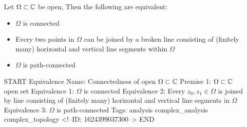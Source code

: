 \documentclass{memoir}
\begin{document}
\begin{thm}
	Let \(\Omega\subset \mathbb{C}\) be open, Then the following are equivalent:
	\begin{itemize}
		\item \(\Omega\) is connected
		\item Every two points in \(\Omega\) can be joined by a broken line consisting of (finitely many) horizontal and vertical line segments within \(\Omega\)
		\item \(\Omega\) is path-connected
	\end{itemize}
\end{thm}

\begin{anki}
START
Equivalence
Name: Connectedness of open \(\Omega\subset \mathbb{C}\)
Premise 1:  \(\Omega\subset \mathbb{C}\) open set
Equivalence 1: \(\Omega\) is connected
Equivalence 2: Every \(z_0,z_1 \in \Omega\) is joined by line consisting of (finitely many) horizontal and vertical line segments in \(\Omega\)
Equivalence 3: \(\Omega\) is path-connected
Tags: analysis complex_analysis complex_topology
<!--ID: 1624399037300-->
END
\end{anki}
\end{document}
